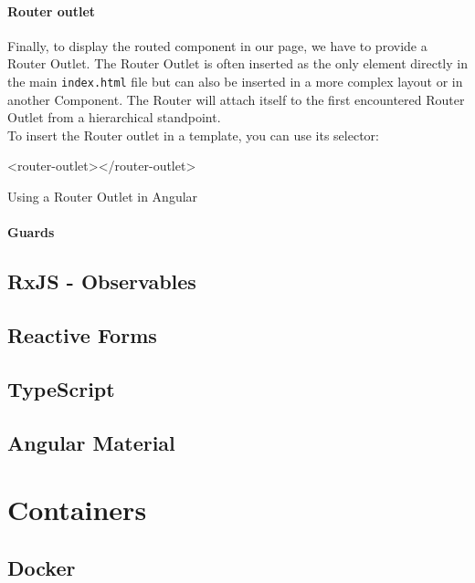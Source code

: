 \documentclass[11pt,a4paper]{report}
\newenvironment{code}{\captionsetup{type=listing}}{}
\begin{document}
\paragraph{Router outlet}
Finally, to display the routed component in our page, we have to provide a Router Outlet. The Router Outlet is often inserted as the only element directly in the main \verb+index.html+ file but can also be inserted in a more complex layout or in another Component. The Router will attach itself to the first encountered Router Outlet from a hierarchical standpoint.\\

To insert the Router outlet in a template, you can use its selector:
\begin{code}
\begin{inlinehtml}
<router-outlet></router-outlet>
\end{inlinehtml}
	\caption{Using a Router Outlet in Angular}
\end{code}


\paragraph{Guards}
\label{guards}

\subsection{RxJS - Observables}
\subsection{Reactive Forms}
\subsection{TypeScript}
\subsection{Angular Material}
\section{Containers}
\subsection{Docker}
\end{document}
